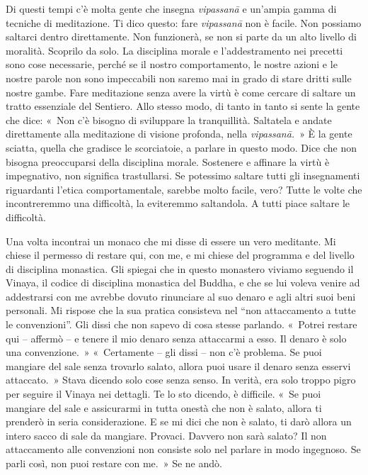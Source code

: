Di questi tempi c'è molta gente che insegna \emph{vipassanā} e un'ampia
gamma di tecniche di meditazione. Ti dico questo: fare \emph{vipassanā}
non è facile. Non possiamo saltarci dentro direttamente. Non funzionerà,
se non si parte da un alto livello di moralità. Scoprilo da solo. La
disciplina morale e l'addestramento nei precetti sono cose necessarie,
perché se il nostro comportamento, le nostre azioni e le nostre parole
non sono impeccabili non saremo mai in grado di stare dritti sulle
nostre gambe. Fare meditazione senza avere la virtù è come cercare di
saltare un tratto essenziale del Sentiero. Allo stesso modo, di tanto in
tanto si sente la gente che dice: «~Non c'è bisogno di sviluppare la
tranquillità. Saltatela e andate direttamente alla meditazione di
visione profonda, nella \emph{vipassanā.}~» È la gente sciatta, quella
che gradisce le scorciatoie, a parlare in questo modo. Dice che non
bisogna preoccuparsi della disciplina morale. Sostenere e affinare la
virtù è impegnativo, non significa trastullarsi. Se potessimo saltare
tutti gli insegnamenti riguardanti l'etica comportamentale, sarebbe
molto facile, vero? Tutte le volte che incontreremmo una difficoltà, la
eviteremmo saltandola. A tutti piace saltare le difficoltà.

Una volta incontrai un monaco che mi disse di essere un vero meditante.
Mi chiese il permesso di restare qui, con me, e mi chiese del programma
e del livello di disciplina monastica. Gli spiegai che in questo
monastero viviamo seguendo il Vinaya, il codice di disciplina monastica
del Buddha, e che se lui voleva venire ad addestrarsi con me avrebbe
dovuto rinunciare al suo denaro e agli altri suoi beni personali. Mi
rispose che la sua pratica consisteva nel ``non attaccamento a tutte le
convenzioni''. Gli dissi che non sapevo di cosa stesse parlando.
«~Potrei restare qui -- affermò -- e tenere il mio denaro senza
attaccarmi a esso. Il denaro è solo una convenzione.~» «~Certamente --
gli dissi -- non c'è problema. Se puoi mangiare del sale senza trovarlo
salato, allora puoi usare il denaro senza esservi attaccato.~» Stava
dicendo solo cose senza senso. In verità, era solo troppo pigro per
seguire il Vinaya nei dettagli. Te lo sto dicendo, è difficile. «~Se
puoi mangiare del sale e assicurarmi in tutta onestà che non è salato,
allora ti prenderò in seria considerazione. E se mi dici che non è
salato, ti darò allora un intero sacco di sale da mangiare. Provaci.
Davvero non sarà salato? Il non attaccamento alle convenzioni non
consiste solo nel parlare in modo ingegnoso. Se parli così, non puoi
restare con me.~» Se ne andò.

